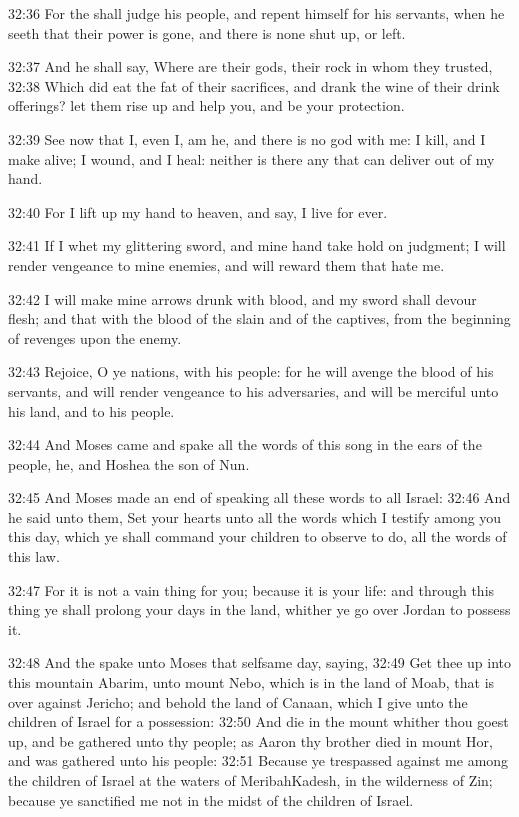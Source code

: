 32:36 For the \LORD shall judge his people, and repent himself for his
servants, when he seeth that their power is gone, and there is none
shut up, or left.

32:37 And he shall say, Where are their gods, their rock in whom they
trusted, 32:38 Which did eat the fat of their sacrifices, and drank
the wine of their drink offerings? let them rise up and help you, and
be your protection.

32:39 See now that I, even I, am he, and there is no god with me: I
kill, and I make alive; I wound, and I heal: neither is there any that
can deliver out of my hand.

32:40 For I lift up my hand to heaven, and say, I live for ever.

32:41 If I whet my glittering sword, and mine hand take hold on
judgment; I will render vengeance to mine enemies, and will reward
them that hate me.

32:42 I will make mine arrows drunk with blood, and my sword shall
devour flesh; and that with the blood of the slain and of the
captives, from the beginning of revenges upon the enemy.

32:43 Rejoice, O ye nations, with his people: for he will avenge the
blood of his servants, and will render vengeance to his adversaries,
and will be merciful unto his land, and to his people.

32:44 And Moses came and spake all the words of this song in the ears
of the people, he, and Hoshea the son of Nun.

32:45 And Moses made an end of speaking all these words to all Israel:
32:46 And he said unto them, Set your hearts unto all the words which
I testify among you this day, which ye shall command your children to
observe to do, all the words of this law.

32:47 For it is not a vain thing for you; because it is your life: and
through this thing ye shall prolong your days in the land, whither ye
go over Jordan to possess it.

32:48 And the \LORD spake unto Moses that selfsame day, saying, 32:49
Get thee up into this mountain Abarim, unto mount Nebo, which is in
the land of Moab, that is over against Jericho; and behold the land of
Canaan, which I give unto the children of Israel for a possession:
32:50 And die in the mount whither thou goest up, and be gathered unto
thy people; as Aaron thy brother died in mount Hor, and was gathered
unto his people: 32:51 Because ye trespassed against me among the
children of Israel at the waters of MeribahKadesh, in the wilderness
of Zin; because ye sanctified me not in the midst of the children of
Israel.

